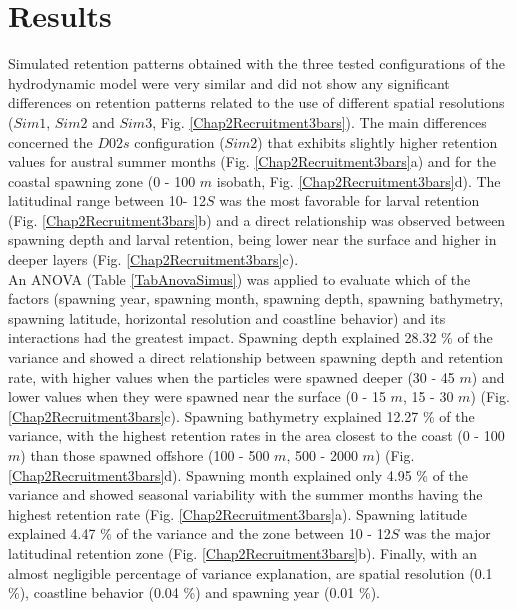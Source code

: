 \clearpage
\section{Results}\label{Chap2Resu}

Simulated retention patterns obtained with the three tested configurations of the hydrodynamic model were very similar and did not show any significant differences on retention patterns related to the use of different spatial resolutions ($Sim 1$, $Sim 2$ and $Sim 3$, Fig. \ref{Chap2Recruitment3bars}). The main differences concerned the $D02s$ configuration ($Sim 2$) that exhibits slightly higher retention values for austral summer months (Fig. \ref{Chap2Recruitment3bars}a) and for the coastal spawning zone (0 - 100 $m$ isobath, Fig. \ref{Chap2Recruitment3bars}d). The latitudinal range between 10\textdegree - 12\textdegree $S$ was the most favorable for larval retention (Fig. \ref{Chap2Recruitment3bars}b) and a direct relationship was observed between spawning depth and larval retention, being lower near the surface and higher in deeper layers (Fig. \ref{Chap2Recruitment3bars}c).\\

An ANOVA (Table \ref{TabAnovaSimus}) was applied to evaluate which of the factors (spawning year, spawning month, spawning depth, spawning bathymetry, spawning latitude, horizontal resolution and coastline behavior) and its interactions had the greatest impact. Spawning  depth explained 28.32 \% of the variance and showed a direct relationship between spawning depth and retention rate, with higher values when the particles were spawned deeper (30 - 45 $m$) and lower values when they were spawned near the surface (0 - 15 $m$, 15 - 30 $m$) (Fig. \ref{Chap2Recruitment3bars}c). Spawning bathymetry explained 12.27 \% of the variance, with the highest retention rates in the area closest to the coast (0 - 100 $m$) than those spawned offshore (100 - 500 $m$, 500 - 2000 $m$) (Fig. \ref{Chap2Recruitment3bars}d). Spawning month explained only 4.95 \% of the variance and showed seasonal variability with the summer months having the highest retention rate (Fig. \ref{Chap2Recruitment3bars}a). Spawning latitude explained 4.47 \% of the variance and the zone between 10 - 12\textdegree $S$ was the major latitudinal retention zone (Fig. \ref{Chap2Recruitment3bars}b). Finally, with an almost negligible percentage of variance explanation, are spatial resolution (0.1 \%), coastline behavior (0.04 \%) and spawning year (0.01 \%).\\

